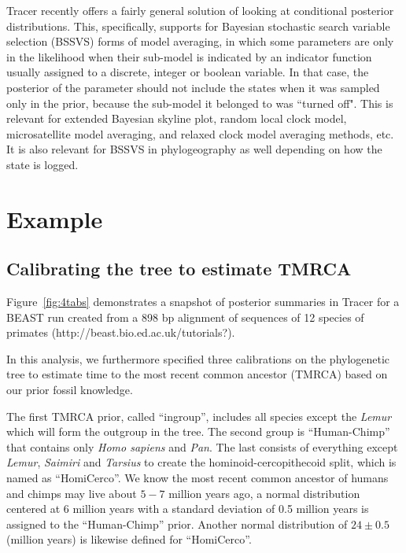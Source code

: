 \documentclass{bioinfo}
\begin{document}
Tracer recently offers a fairly general solution of looking at conditional posterior distributions. This, specifically, supports for Bayesian stochastic search variable selection (BSSVS) forms of model averaging, in which some parameters are only in the likelihood when their sub-model is indicated by an indicator function usually assigned to a discrete, integer or boolean variable. In that case, the posterior of the parameter should not include the states when it was sampled only in the prior, because the sub-model it belonged to was ``turned off". This is relevant for extended Bayesian skyline plot, random local clock model, microsatellite model averaging, and relaxed clock model averaging methods, etc. It is also relevant for BSSVS in phylogeography as well depending on how the state is logged.


\section*{Example}


\subsection*{Calibrating the tree to estimate TMRCA}

Figure~\ref{fig:4tabs} demonstrates a snapshot of posterior summaries in Tracer for a BEAST \citep{drummond2007beast} run created from a 898 bp alignment of sequences of 12 species of primates (http://beast.bio.ed.ac.uk/tutorials?). %

In this analysis, we furthermore specified three calibrations on the phylogenetic tree to estimate time to the most recent common ancestor (TMRCA) based on our prior fossil knowledge. 

The first TMRCA prior, called ``ingroup'', includes all species except the \textit{Lemur} which will form the outgroup in the tree. %
The second group is ``Human-Chimp'' that contains only \textit{Homo sapiens} and \textit{Pan}. 
The last consists of everything except \textit{Lemur}, \textit{Saimiri} and \textit{Tarsius} to create the hominoid-cercopithecoid split, which is named as ``HomiCerco''. 
We know the most recent common ancestor of humans and chimps may live about $5-7$ million years ago, a normal distribution centered at 6 million years with a standard deviation of 0.5 million years is assigned to the ``Human-Chimp'' prior. 
Another normal distribution of $24 \pm 0.5$ (million years) is likewise defined for ``HomiCerco''.
\end{document}
